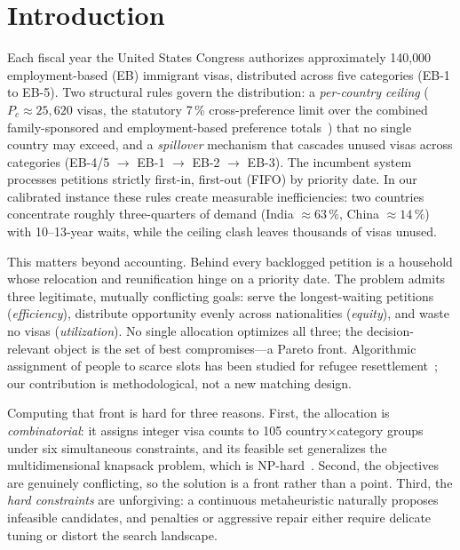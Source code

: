 \documentclass[runningheads]{llncs}
\begin{document}
\section{Introduction}
\label{sec:intro}

Each fiscal year the United States Congress authorizes approximately 140{,}000 employment-based (EB) immigrant visas, distributed across five categories (EB-1 to EB-5). Two structural rules govern the distribution: a \emph{per-country ceiling} ($P_c \approx 25{,}620$ visas, the statutory 7\,\% cross-preference limit over the combined family-sponsored and employment-based preference totals~\cite{uscis}) that no single country may exceed, and a \emph{spillover} mechanism that cascades unused visas across categories (EB-4/5 $\rightarrow$ EB-1 $\rightarrow$ EB-2 $\rightarrow$ EB-3). The incumbent system processes petitions strictly first-in, first-out (FIFO) by priority date. In our calibrated instance these rules create measurable inefficiencies: two countries concentrate roughly three-quarters of demand (India $\approx 63\,\%$, China $\approx 14\,\%$) with 10--13-year waits, while the ceiling clash leaves thousands of visas unused.

This matters beyond accounting. Behind every backlogged petition is a household whose relocation and reunification hinge on a priority date. The problem admits three legitimate, mutually conflicting goals: serve the longest-waiting petitions (\emph{efficiency}), distribute opportunity evenly across nationalities (\emph{equity}), and waste no visas (\emph{utilization}). No single allocation optimizes all three; the decision-relevant object is the set of best compromises---a Pareto front. Algorithmic assignment of people to scarce slots has been studied for refugee resettlement~\cite{bansak}; our contribution is methodological, not a new matching design.

Computing that front is hard for three reasons. First, the allocation is \emph{combinatorial}: it assigns integer visa counts to 105 country$\times$category groups under six simultaneous constraints, and its feasible set generalizes the multidimensional knapsack problem, which is NP-hard~\cite{garey}. Second, the objectives are genuinely conflicting, so the solution is a front rather than a point. Third, the \emph{hard constraints} are unforgiving: a continuous metaheuristic naturally proposes infeasible candidates, and penalties or aggressive repair either require delicate tuning or distort the search landscape.
\end{document}
